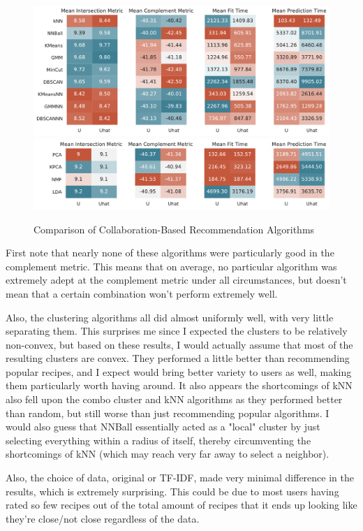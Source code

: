 \documentclass[11pt]{article}
\begin{document}
\begin{figure}[b!]
\centering
\includegraphics[width=1\textwidth]{figs/user_rdr.pdf}
\includegraphics[width=1\textwidth]{figs/user_dr.pdf}
\caption{Comparison of Collaboration-Based Recommendation Algorithms}
\label{fig:user_results}
\end{figure}

First note that nearly none of these algorithms were particularly good in the complement metric. This means that on average, no particular algorithm was extremely adept at the complement metric under all circumstances, but doesn't mean that a certain combination won't perform extremely well.

Also, the clustering algorithms all did almost uniformly well, with very little separating them. This surprises me since I expected the clusters to be relatively non-convex, but based on these results, I would actually assume that most of the resulting clusters are convex. They performed a little better than recommending popular recipes, and I expect would bring better variety to users as well, making them particularly worth having around. It also appears the shortcomings of kNN also fell upon the combo cluster and kNN algorithms as they performed better than random, but still worse than just recommending popular algorithms. I would also guess that NNBall essentially acted as a "local" cluster by just selecting everything within a radius of itself, thereby circumventing the shortcomings of kNN (which may reach very far away to select a neighbor).

Also, the choice of data, original or TF-IDF, made very minimal difference in the results, which is extremely surprising. This could be due to most users having rated so few recipes out of the total amount of recipes that it ends up looking like they're close/not close regardless of the data. 
\end{document}
